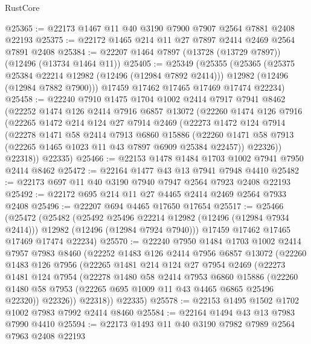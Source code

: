 \begin{lexlean}{RustCore}
\begin{coremodule}
@25365 := @22173 @1467 @11 @40 @3190 @7900 @7907 @2564 @7881 @2408 @22193
@25375 := @22172 @1465 @214 @11 @27 @7897 @2414 @2469 @2564 @7891 @2408
@25384 := @22207 @1464 @7897 (@13728 (@13729 @7897)) (@12496 (@13734 @1464 @11))
@25405 := @25349
    (@25355
      (@25365
        (@25375 @25384 @22214 @12982 (@12496 (@12984 @7892 @2414)))
        @12982
        (@12496 (@12984 @7882 @7900)))
      @17459
      @17462
      @17465
      @17469
      @17474
      @22234)
@25458 := @22240
    @7910
    @1475
    @1704
    @1002
    @2414
    @7917
    @7941
    @8462
    (@22252
      @1474
      @126
      @2414
      @7916
      @6857
      @13072
      (@22260
        @1474
        @126
        @7916
        (@22265
          @1472
          @214
          @124
          @27
          @7914
          @2469
          (@22273
            @1472
            @124
            @7914
            (@22278
              @1471
              @58
              @2414
              @7913
              @6860
              @15886
              (@22260 @1471 @58 @7913 (@22265 @1465 @1023 @11 @43 @7897 @6909 @25384 @22457))
              @22326))
          @22318))
      @22335)
@25466 := @22153 @1478 @1484 @1703 @1002 @7941 @7950 @2414 @8462
@25472 := @22164 @1477 @43 @13 @7941 @7948 @4410
@25482 := @22173 @697 @11 @40 @3190 @7940 @7947 @2564 @7923 @2408 @22193
@25492 := @22172 @695 @214 @11 @27 @4465 @2414 @2469 @2564 @7933 @2408
@25496 := @22207 @694 @4465 @17650 @17654
@25517 := @25466
    (@25472
      (@25482
        (@25492 @25496 @22214 @12982 (@12496 (@12984 @7934 @2414)))
        @12982
        (@12496 (@12984 @7924 @7940)))
      @17459
      @17462
      @17465
      @17469
      @17474
      @22234)
@25570 := @22240
    @7950
    @1484
    @1703
    @1002
    @2414
    @7957
    @7983
    @8460
    (@22252
      @1483
      @126
      @2414
      @7956
      @6857
      @13072
      (@22260
        @1483
        @126
        @7956
        (@22265
          @1481
          @214
          @124
          @27
          @7954
          @2469
          (@22273
            @1481
            @124
            @7954
            (@22278
              @1480
              @58
              @2414
              @7953
              @6860
              @15886
              (@22260 @1480 @58 @7953 (@22265 @695 @1009 @11 @43 @4465 @6865 @25496 @22320))
              @22326))
          @22318))
      @22335)
@25578 := @22153 @1495 @1502 @1702 @1002 @7983 @7992 @2414 @8460
@25584 := @22164 @1494 @43 @13 @7983 @7990 @4410
@25594 := @22173 @1493 @11 @40 @3190 @7982 @7989 @2564 @7963 @2408 @22193

\end{coremodule}
\end{lexlean}
